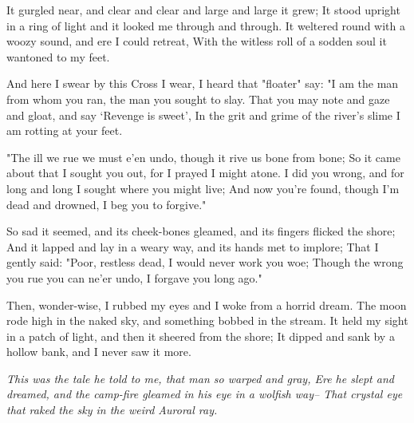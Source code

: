 \begin{poemblock}
 It gurgled near, and clear and clear and large and large it grew;
 It stood upright in a ring of light and it looked me through and through.
 It weltered round with a woozy sound, and ere I could retreat,
 With the witless roll of a sodden soul it wantoned to my feet.

 And here I swear by this Cross I wear, I heard that "floater" say:
 "I am the man from whom you ran, the man you sought to slay.
 That you may note and gaze and gloat, and say `Revenge is sweet',
 In the grit and grime of the river's slime I am rotting at your feet.

 "The ill we rue we must e'en undo, though it rive us bone from bone;
 So it came about that I sought you out, for I prayed I might atone.
 I did you wrong, and for long and long I sought where you might live;
 And now you're found, though I'm dead and drowned, I beg you to forgive."

 So sad it seemed, and its cheek-bones gleamed,
   and its fingers flicked the shore;
 And it lapped and lay in a weary way, and its hands met to implore;
 That I gently said:  "Poor, restless dead, I would never work you woe;
 Though the wrong you rue you can ne'er undo, I forgave you long ago."

 Then, wonder-wise, I rubbed my eyes and I woke from a horrid dream.
 The moon rode high in the naked sky, and something bobbed in the stream.
 It held my sight in a patch of light, and then it sheered from the shore;
 It dipped and sank by a hollow bank, and I never saw it more.

\textit{
  This was the tale he told to me, that man so warped and gray,
  Ere he slept and dreamed, and the camp-fire gleamed
in his eye in a wolfish way--
  That crystal eye that raked the sky in the weird Auroral ray.
}
\end{poemblock}
